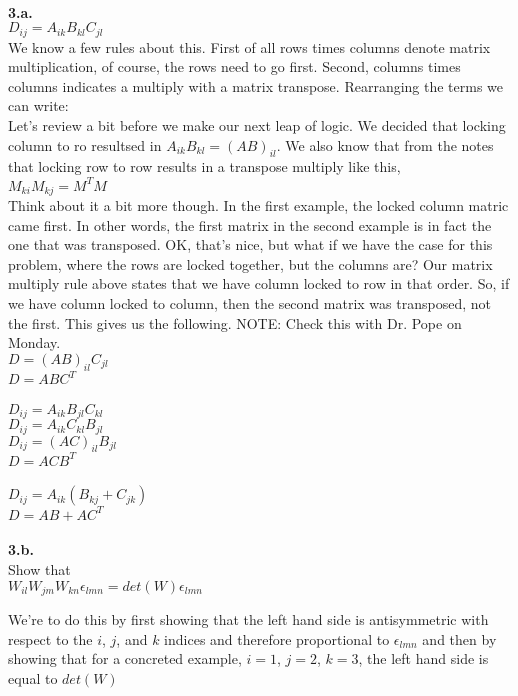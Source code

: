 \documentclass[prb,preprint]
{revtex4-1}
\newcommand{\PRLsep}{\noindent\makebox[\linewidth]{\resizebox{0.8888\linewidth}{2pt}{$\bullet$}}\bigskip}
\begin{document}
\PRLsep
\\
\newpage
\bigskip
{\bf 3.a.}
\\
$D_{ij} = A_{ik} B_{kl} C_{jl}$
\\
We know a few rules about this.  First of all rows times columns denote matrix multiplication, of course, the rows need to go first.  Second, columns times columns indicates a multiply with a matrix transpose.  Rearranging the terms we can write:
\\
Let's review a bit before we make our next leap of logic.  We decided that locking column to ro resultsed in $A_{ik} B_{kl} = \left(AB\right)_{il}$.  We also know that from the notes that locking row to row results in a transpose multiply like this, 
\\
$M_{ki}M_{kj} = M^T M$
\\
Think about it a bit more though.  In the first example, the locked column matric came first.  In other words, the first matrix in the second example is in fact the one that was transposed.  OK, that's nice, but what if we have the case for this problem, where the rows are locked together, but the columns are?  Our matrix multiply rule above states that we have column locked to row in that order.  So, if we have column locked to column, then the second matrix was transposed, not the first.  This gives us the following.  NOTE:  Check this with Dr. Pope on Monday.
\\
$D = \left(AB\right)_{il} C_{jl}$
\\
$D = ABC^T$
\\
\PRLsep
\\
$D_{ij} = A_{ik} B_{jl} C_{kl}$
\\
$D_{ij} = A_{ik} C_{kl} B_{jl}$
\\
$D_{ij} = \left(AC\right)_{il} B_{jl}$
\\
$D = ACB^T$
\\
\PRLsep
\\
$D_{ij} = A_{ik} \left(B_{kj} + C_{jk}\right)$
\\
$D = AB + AC^T$
\\
\PRLsep
\\
{\bf 3.b.}  
\\
Show that 
\\
$W_{il}W_{jm}W_{kn}\epsilon_{lmn} = det\left(W\right)\epsilon_{lmn}$

We're to do this by first showing that the left hand side is antisymmetric with respect to the $i$, $j$, and $k$ indices and therefore proportional to $\epsilon_{lmn}$ and then by showing that for a concreted example, $i=1$, $j=2$, $k=3$, the left hand side is equal to $det\left(W\right)$
\end{document}
